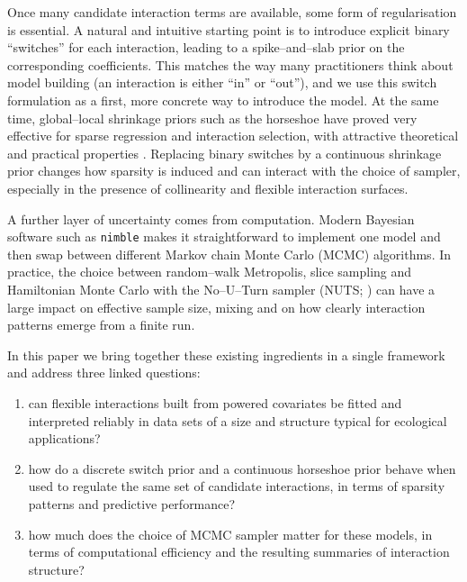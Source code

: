 \documentclass[11pt]{article}
\begin{document}
\begin{doublespacing}
\begin{linenumbers}
\begin{flushleft}
Once many candidate interaction terms are available, some form of regularisation is essential. A natural and intuitive starting point is to introduce explicit binary ``switches'' for each interaction, leading to a spike–and–slab prior on the corresponding coefficients. This matches the way many practitioners think about model building (an interaction is either ``in'' or ``out''), and we use this switch formulation as a first, more concrete way to introduce the model. At the same time, global–local shrinkage priors such as the horseshoe have proved very effective for sparse regression and interaction selection, with attractive theoretical and practical properties \citep{2010_carvalho,2017_piironen}. Replacing binary switches by a continuous shrinkage prior changes how sparsity is induced and can interact with the choice of sampler, especially in the presence of collinearity and flexible interaction surfaces.

A further layer of uncertainty comes from computation. Modern Bayesian software such as \texttt{nimble} \citep{2017_deValpine} makes it straightforward to implement one model and then swap between different Markov chain Monte Carlo (MCMC) algorithms. In practice, the choice between random–walk Metropolis, slice sampling \citep{2003_neal} and Hamiltonian Monte Carlo with the No–U–Turn sampler (NUTS; \citealp{2014_hoffman}) can have a large impact on effective sample size, mixing and on how clearly interaction patterns emerge from a finite run.

In this paper we bring together these existing ingredients in a single framework and address three linked questions:
\begin{enumerate}
  \item can flexible interactions built from powered covariates be fitted and interpreted reliably in data sets of a size and structure typical for ecological applications?
  \item how do a discrete switch prior and a continuous horseshoe prior behave when used to regulate the same set of candidate interactions, in terms of sparsity patterns and predictive performance?
  \item how much does the choice of MCMC sampler matter for these models, in terms of computational efficiency and the resulting summaries of interaction structure?
\end{enumerate}


\end{flushleft}
\end{linenumbers}
\end{doublespacing}
\end{document}
